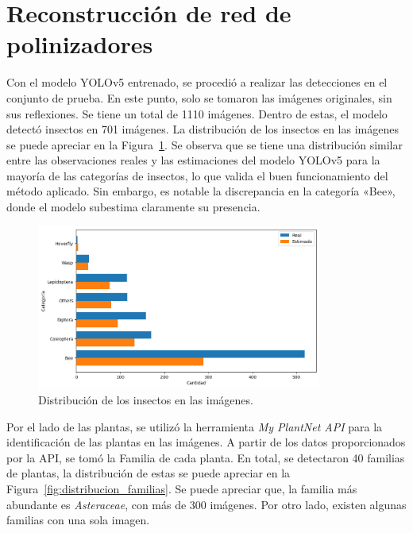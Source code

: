 \section{Reconstrucción de red de polinizadores}

Con el modelo YOLOv5 entrenado, se procedió a realizar las detecciones en el conjunto de prueba. En este punto, solo se tomaron las imágenes originales, sin sus reflexiones. Se tiene un total de 1110 imágenes. Dentro de estas, el modelo detectó insectos en 701 imágenes. La distribución de los insectos en las imágenes se puede apreciar en la Figura~\ref{fig:distribucion_insectos}. Se observa que se tiene una distribución similar entre las observaciones reales y las estimaciones del modelo YOLOv5 para la mayoría de las categorías de insectos, lo que valida el buen funcionamiento del método aplicado. Sin embargo, es notable la discrepancia en la categoría «Bee», donde el modelo subestima claramente su presencia.

\begin{figure}[H]
    \centering
    \includegraphics[width=0.835\textwidth]{Figuras/distribucion_insectos.png}
    \caption{Distribución de los insectos en las imágenes.}
    \label{fig:distribucion_insectos}
\end{figure}


Por el lado de las plantas, se utilizó la herramienta \textit{My PlantNet API} \cite{PlantNet} para la identificación de las plantas en las imágenes. A partir de los datos proporcionados por la API, se tomó la Familia de cada planta. En total, se detectaron 40 familias de plantas, la distribución de estas se puede apreciar en la Figura~\ref{fig:distribucion_familias}. Se puede apreciar que, la familia más abundante es \textit{Asteraceae}, con más de 300 imágenes. Por otro lado, existen algunas familias con una sola imagen.

